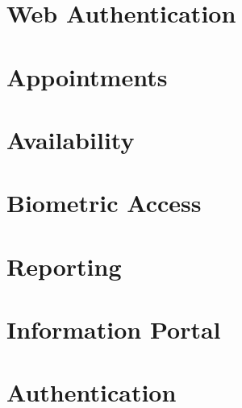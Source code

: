 \documentclass[11pt,a4paper,titlepage]{article}
\begin{document}
	\section{Web Authentication}
		
	\section{Appointments}
	
	
	
	\section{Availability}
	
		
	\section{Biometric Access}
	
	
	\section{Reporting}
	
	
	\section{Information Portal}
	
	
	\newpage
	\section{Authentication}
	

	

	
\end{document}
